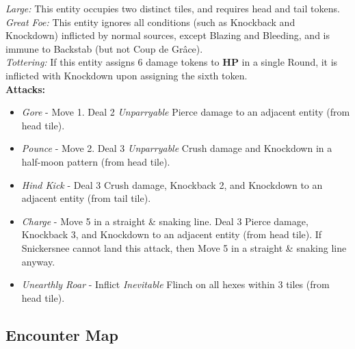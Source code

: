 \emph{Large:} This entity occupies two distinct tiles, and requires head and tail tokens.\\

\emph{Great Foe:} This entity ignores all conditions (such as Knockback and Knockdown) inflicted by normal sources, except Blazing and Bleeding, and is immune to Backstab (but not Coup de Grâce).\\

\emph{Tottering:} If this entity assigns 6 damage tokens to \textbf{HP} in a single Round, it is inflicted with Knockdown upon assigning the sixth token.\\

\textbf{Attacks:}
\begin{itemize}
\item \emph{Gore} -  Move 1. Deal 2 \emph{Unparryable} Pierce damage to an adjacent entity (from head tile).
\item \emph{Pounce} - Move 2. Deal 3 \emph{Unparryable} Crush damage and Knockdown in a half-moon pattern (from head tile).
\item \emph{Hind Kick} - Deal 3 Crush damage, Knockback 2, and Knockdown to an adjacent entity (from tail tile).
\item \emph{Charge} - Move 5 in a straight \& snaking line. Deal 3 Pierce damage, Knockback 3, and Knockdown to an adjacent entity (from head tile). If Snickersnee cannot land this attack, then Move 5 in a straight \& snaking line anyway.
\item \emph{Unearthly Roar} - Inflict \emph{Inevitable} Flinch on all hexes within 3 tiles (from head tile).
\end{itemize}

\pagebreak

\subsection*{Encounter Map}
\begin{center}
\end{center}

